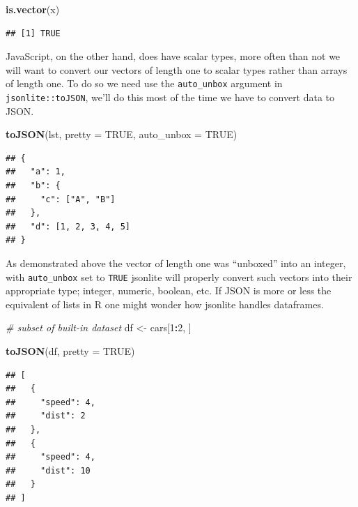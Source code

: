 \documentclass[
]{krantz}
\makeatletter
\newenvironment{Shaded}{\begin{snugshade}}{\end{snugshade}}
\newcommand{\CommentTok}[1]{\textcolor[rgb]{0.37,0.37,0.37}{\textit{#1}}}
\newcommand{\DataTypeTok}[1]{\textcolor[rgb]{0.27,0.27,0.27}{#1}}
\newcommand{\DecValTok}[1]{\textcolor[rgb]{0.06,0.06,0.06}{#1}}
\newcommand{\KeywordTok}[1]{\textcolor[rgb]{0.27,0.27,0.27}{\textbf{#1}}}
\newcommand{\NormalTok}[1]{#1}
\newcommand{\OperatorTok}[1]{\textcolor[rgb]{0.43,0.43,0.43}{\textbf{#1}}}
\newcommand{\OtherTok}[1]{\textcolor[rgb]{0.37,0.37,0.37}{#1}}
\newcommand{\StringTok}[1]{\textcolor[rgb]{0.5,0.5,0.5}{#1}}
\newenvironment{kframe}{%
\medskip{}
\setlength{\fboxsep}{.8em}
 \def\at@end@of@kframe{}%
 \ifinner\ifhmode%
  \def\at@end@of@kframe{\end{minipage}}%
  \begin{minipage}{\columnwidth}%
 \fi\fi%
 \def\FrameCommand##1{\hskip\@totalleftmargin \hskip-\fboxsep
 \colorbox{shadecolor}{##1}\hskip-\fboxsep
     \hskip-\linewidth \hskip-\@totalleftmargin \hskip\columnwidth}%
 \MakeFramed {\advance\hsize-\width
   \@totalleftmargin\z@ \linewidth\hsize
   \@setminipage}}%
 {\par\unskip\endMakeFramed%
 \at@end@of@kframe}
\renewenvironment{Shaded}{\begin{kframe}}{\end{kframe}}
\makeatother
\begin{document}
\begin{Shaded}
\begin{Highlighting}[]
\KeywordTok{is.vector}\NormalTok{(x)}
\end{Highlighting}
\end{Shaded}

\begin{verbatim}
## [1] TRUE
\end{verbatim}

JavaScript, on the other hand, does have scalar types, more often than not we will want to convert our vectors of length one to scalar types rather than arrays of length one. To do so we need use the \texttt{auto\_unbox} argument in \texttt{jsonlite::toJSON}, we'll do this most of the time we have to convert data to JSON.

\begin{Shaded}
\begin{Highlighting}[]
\KeywordTok{toJSON}\NormalTok{(lst, }\DataTypeTok{pretty =} \OtherTok{TRUE}\NormalTok{, }\DataTypeTok{auto\_unbox =} \OtherTok{TRUE}\NormalTok{)}
\end{Highlighting}
\end{Shaded}

\begin{verbatim}
## {
##   "a": 1,
##   "b": {
##     "c": ["A", "B"]
##   },
##   "d": [1, 2, 3, 4, 5]
## }
\end{verbatim}

As demonstrated above the vector of length one was ``unboxed'' into an integer, with \texttt{auto\_unbox} set to \texttt{TRUE} jsonlite will properly convert such vectors into their appropriate type; integer, numeric, boolean, etc. If JSON is more or less the equivalent of lists in R one might wonder how jsonlite handles dataframes.

\begin{Shaded}
\begin{Highlighting}[]
\CommentTok{\# subset of built{-}in dataset}
\NormalTok{df <{-}}\StringTok{ }\NormalTok{cars[}\DecValTok{1}\OperatorTok{:}\DecValTok{2}\NormalTok{, ]}

\KeywordTok{toJSON}\NormalTok{(df, }\DataTypeTok{pretty =} \OtherTok{TRUE}\NormalTok{)}
\end{Highlighting}
\end{Shaded}

\begin{verbatim}
## [
##   {
##     "speed": 4,
##     "dist": 2
##   },
##   {
##     "speed": 4,
##     "dist": 10
##   }
## ]
\end{verbatim}
\end{document}
